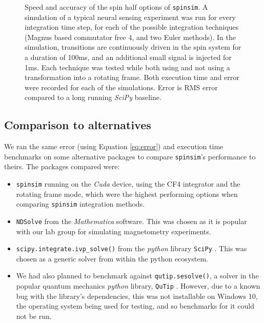 \documentclass{jors}
\begin{document}
\begin{figure}[h!]
\begin{subfigure}[b]{0.475\textwidth}
				\caption{}
				\label{fig:benchmark_spin_half_execution_error}
			\end{subfigure}
			\caption{Speed and accuracy of the spin half options of \texttt{spinsim}. A simulation of a typical neural sensing experiment was run for every integration time step, for each of the possible integration techniques (Magnus based commutator free 4, and two Euler methods). In the simulation, transitions are continuously driven in the spin system for a duration of 100ms, and an additional small signal is injected for 1ms. Each technique was tested while both using and not using a transformation into a rotating frame. Both execution time and error were recorded for each of the simulations. Error is RMS error compared to a long running \emph{SciPy} baseline.}
			\label{fig:benchmark_spin_half}
		\end{figure}

	\subsection{Comparison to alternatives}
		We ran the same error (using Equation \eqref{eq:error}) and execution time benchmarks on some alternative packages to compare \texttt{spinsim}'s performance to theirs. The packages compared were:
		\begin{itemize}
			\item \texttt{spinsim} running on the \emph{Cuda} device, using the CF4 integrator and the rotating frame mode, which were the highest performing options when comparing \texttt{spinsim} integration methods.
			\item \texttt{NDSolve} from the \emph{Mathematica} \cite{wolfram_research_inc_mathematica_2020} software. This was chosen as it is popular with our lab group for simulating magnetometry experiments.
			\item \texttt{scipy.integrate.ivp\_solve()} from the \emph{python} library \texttt{SciPy} \cite{virtanen_scipy_2020}. This was chosen as a generic solver from within the python ecosystem.
			\item We had also planned to benchmark against \texttt{qutip.sesolve()}, a solver in the popular quantum mechanics \emph{python} library, \texttt{QuTip} \cite{johansson_qutip_2013}. However, due to a known bug with the library’s dependencies, this was not installable on Windows 10, the operating system being used for testing, and so benchmarks for it could not be run.
		\end{itemize}
\end{document}
